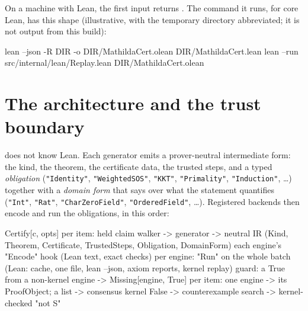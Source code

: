 On a machine with Lean, the first input returns . The
command it runs, for core Lean, has this shape (illustrative, with the temporary
directory abbreviated; it is not output from this build):

\begin{shell}
lean --json -R DIR -o DIR/MathildaCert.olean DIR/MathildaCert.lean
lean --run src/internal/lean/Replay.lean DIR/MathildaCert.olean
\end{shell}


\section{The architecture and the trust boundary}
\label{sec:cert-architecture}

 does not know Lean. Each generator emits a prover-neutral
intermediate form: the kind, the theorem, the
certificate data, the trusted steps, and a typed \emph{obligation}
(\texttt{"Identity"}, \texttt{"WeightedSOS"}, \texttt{"KKT"}, \texttt{"Primality"},
\texttt{"Induction"}, \ldots) together with a \emph{domain form} that says over what the
statement quantifies (\texttt{"Int"}, \texttt{"Rat"}, \texttt{"CharZeroField"},
\texttt{"OrderedField"}, \ldots). Registered backends then
encode and run the obligations, in this order:

\begin{ccode}
Certify[c, opts]
  per item:   held claim walker -> generator -> neutral IR (Kind, Theorem,
              Certificate, TrustedSteps, Obligation, DomainForm)
              each engine's "Encode" hook (Lean text, exact checks)
  per engine: "Run" on the whole batch (Lean: cache, one file, lean --json,
              axiom reports, kernel replay)
              guard: a True from a non-kernel engine -> Missing[engine, True]
  per item:   one engine -> its ProofObject; a list -> consensus
              kernel False -> counterexample search -> kernel-checked "not S"
\end{ccode}

